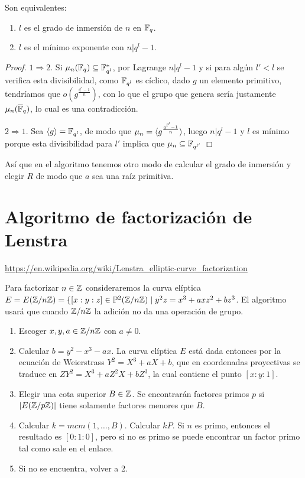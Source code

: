\documentclass[CR.tex]{subfiles}
\begin{document}
\begin{lemma}
Son equivalentes:
\begin{enumerate}
\item $l$ es el grado de inmersión de $n$ en $\mathbb{F}_q$. 
\item $l$ es el mínimo exponente con $n|q^l-1$. 
\end{enumerate}
\end{lemma}
\begin{proof}
$1\Rightarrow 2$. Si $\mu_n(\mathbb{F}_q)\subseteq \mathbb{F}_{q^l}^*$, por Lagrange $n|q^l-1$ y si para algún $l'<l$ se verifica esta divisibilidad, como $\mathbb{F}_{q^l}$ es cíclico, dado $g$ un elemento primitivo, tendríamos que $o(g^{\frac{q^{l'}-1}{n}})$, con lo que el grupo que genera sería justamente $\mu_n(\overline{\mathbb{F}}_q)$, lo cual es una contradicción. 

$2\Rightarrow 1$. Sea $\langle{g}\rangle=\mathbb{F}_{q^l}$, de modo que $\mu_n=\langle{g^{\frac{q^{l'}-1}{n}}}\rangle$, luego $n|q^l-1$ y $l$ es mínimo porque esta divisibilidad para $l'$ implica que $\mu_n\subseteq \mathbb{F}_{q^{l'}}$
\end{proof}


Así que en el algoritmo tenemos otro modo de calcular el grado de inmersión y elegir $R$ de modo que $a$ sea una raíz primitiva. 
\section{Algoritmo de factorización de Lenstra}
\url{https://en.wikipedia.org/wiki/Lenstra_elliptic-curve_factorization} 

Para factorizar $n\in\mathbb{Z}$ consideraremos la curva elíptica $E=E(\mathbb{Z}/n\mathbb{Z})=\{[x:y:z]\in\mathbb{P}^2(\mathbb{Z}/n\mathbb{Z})\mid y^2z=x^3+axz^2+bz^3$. El algoritmo usará que cuando $\mathbb{Z}/n\mathbb{Z}$ la adición no da una operación de grupo.
\begin{enumerate}
\item Escoger $x,y,a\in\mathbb{Z}/n\mathbb{Z}$ con $a\neq 0$. 
\item Calcular $b=y^2-x^3-ax$. La curva elíptica $E$ está dada entonces por la ecuación de Weierstrass $Y^2=X^3+aX+b$, que en coordenadas proyectivas se traduce en $ZY^2=X^3+aZ^2X+bZ^3$, la cual contiene el punto $[x:y:1]$. 
\item Elegir una cota superior $B\in\mathbb{Z}$. Se encontrarán factores primos $p$ si $|E(\mathbb{Z}/p\mathbb{Z})|$ tiene solamente factores menores que $B$.
\item Calcular $k=mcm(1,\dots, B)$. Calcular $kP$. Si $n$ es primo, entonces el resultado es $[0:1:0]$, pero si no es primo se puede encontrar un factor primo tal como sale en el enlace.
\item Si no se encuentra, volver a 2. 

\end{enumerate}
\end{document}

